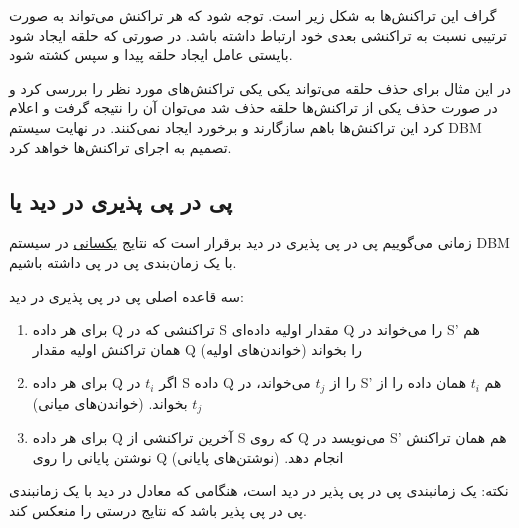 \documentclass[a4paper]{article}
\begin{document}
گراف این تراکنش‌ها به شکل زیر است. توجه شود که هر تراکنش می‌تواند به صورت ترتیبی
نسبت به تراکنشی بعدی خود ارتباط داشته باشد. در صورتی که حلقه ایجاد شود بایستی
عامل ایجاد حلقه پیدا و سپس کشته شود.

\newpage


در این مثال برای حذف حلقه می‌تواند یکی یکی تراکنش‌های مورد نظر را بررسی کرد و در
صورت حذف یکی از تراکنش‌ها حلقه حذف شد می‌توان آن را نتیجه گرفت و اعلام کرد این
تراکنش‌ها باهم سازگارند و برخورد ایجاد نمی‌کنند. در نهایت سیستم DBM تصمیم به
اجرای تراکنش‌ها خواهد کرد.


\subsection{پی در پی پذیری در دید یا }

زمانی می‌گوییم پی در پی پذیری در دید برقرار است که نتایج \underline{یکسانی} در
سیستم DBM با یک زمان‌بندی پی در پی داشته باشیم.

سه قاعده اصلی پی در پی پذیری در دید:

\begin{enumerate}
    \item برای هر داده Q تراکنشی که در S مقدار اولیه داده‌ای Q  را می‌خواند در
    S' هم همان تراکنش اولیه مقدار Q را بخواند (خواندن‌های اولیه)
    \item برای هر داده‌ Q اگر $t_{i}$ در S داده‌ Q را از $t_{j}$ می‌خواند، در S'
    هم $t_{i}$ همان داده‌ را از $t_{j}$ بخواند. (خواندن‌های میانی)
    \item برای هر داده Q آخرین تراکنشی از S که روی Q می‌نویسد در S' هم همان
    تراکنش نوشتن پایانی را روی Q انجام دهد. (نوشتن‌های پایانی)
\end{enumerate}

نکته: یک زمانبندی پی در پی پذیر در دید است، هنگامی که معادل در دید با یک
زمانبندی پی در پی پذیر باشد که نتایج درستی را منعکس کند.
\end{document}
